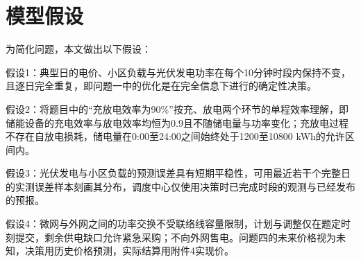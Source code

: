 \section{模型假设}

为简化问题，本文做出以下假设：

假设1：典型日的电价、小区负载与光伏发电功率在每个10分钟时段内保持不变，且逐日完全重复，即问题一中的优化是在完全信息下进行的确定性决策。

假设2：将题目中的“充放电效率为90\%”按充、放电两个环节的单程效率理解，即储能设备的充电效率与放电效率均恒为0.9且不随储电量与功率变化；充放电过程不存在自放电损耗，储电量在0:00至24:00之间始终处于1200至10800 kWh的允许区间内。

假设3：光伏发电与小区负载的预测误差具有短期平稳性，可用最近若干个完整日的实测误差样本刻画其分布，调度中心仅使用决策时已完成时段的观测与已经发布的预报。

假设4：微网与外网之间的功率交换不受联络线容量限制，计划与调整仅在题定时刻提交，剩余供电缺口允许紧急采购；不向外网售电。问题四的未来价格视为未知，决策用历史价格预测，实际结算用附件4实现价。
